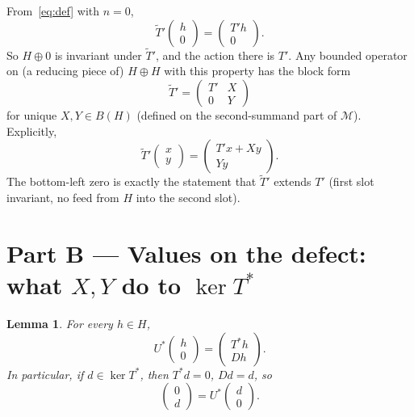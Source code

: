 \documentclass[11pt]{article}
\newtheorem{lemma}{Lemma}
\begin{document}
From~\eqref{eq:def} with \(n=0\),
\[
\widetilde{T}'\begin{pmatrix}h\\ 0\end{pmatrix}
=
\begin{pmatrix}T'h\\ 0\end{pmatrix}.
\]
So \(H\oplus 0\) is invariant under \(\widetilde{T}'\), and the action there is \(T'\).
Any bounded operator on (a reducing piece of) \(H\oplus H\) with this property has the block form
\begin{equation}
\label{eq:block}
\boxed{
\widetilde{T}'
=
\begin{pmatrix}
T' & X \\
0 & Y
\end{pmatrix}
}
\end{equation}
for unique \(X,Y\in B(H)\) (defined on the second-summand part of \(\mathcal{M}\)). Explicitly,
\begin{equation}
\label{eq:action}
\widetilde{T}'\begin{pmatrix}x\\ y\end{pmatrix}
=
\begin{pmatrix}
T'x+Xy\\
Yy
\end{pmatrix}.
\end{equation}
The bottom-left zero is exactly the statement that \(\widetilde{T}'\) extends \(T'\)
(first slot invariant, no feed from \(H\) into the second slot).

\bigskip
\section*{Part B --- Values on the defect: what \(X,Y\) do to \(\ker T^*\)}

\begin{lemma}
For every \(h\in H\),
\begin{equation}
\label{eq:Ustar}
U^*\begin{pmatrix}h\\ 0\end{pmatrix}
=
\begin{pmatrix}T^*h\\ Dh\end{pmatrix}.
\end{equation}
In particular, if \(d\in\ker T^*\), then \(T^*d=0\), \(Dd=d\), so
\begin{equation}
\label{eq:past}
\begin{pmatrix}0\\ d\end{pmatrix}
=
U^*\begin{pmatrix}d\\ 0\end{pmatrix}.
\end{equation}
\end{lemma}
\end{document}
